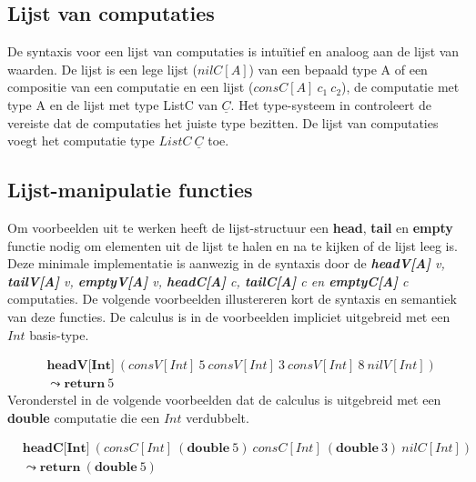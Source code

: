\subsection{Lijst van computaties}
De syntaxis voor een lijst van computaties is intuïtief en analoog aan de lijst van waarden. De lijst is een lege lijst ($nilC[A]$) van een bepaald type A of een compositie van een computatie en een lijst ($consC[A] \  c_1 \ 
 c_2$), de computatie met type A en de lijst met type ListC van $\underline{C}$. Het type-systeem in  controleert de vereiste dat de computaties het juiste type bezitten. De lijst van computaties voegt het computatie type $ListC \ \underline{C}$ toe.

\subsection{Lijst-manipulatie functies}
Om voorbeelden uit te werken heeft de lijst-structuur een \textbf{head}, \textbf{tail} en \textbf{empty} functie nodig om elementen uit de lijst te halen en na te kijken of de lijst leeg is. Deze minimale implementatie is aanwezig in de syntaxis door de \emph{\textbf{headV[A]} v, \textbf{tailV[A]} v, \textbf{emptyV[A]} v, \textbf{headC[A]} c, \textbf{tailC[A]} c en \textbf{emptyC[A]} c} computaties. De volgende voorbeelden illustereren kort de syntaxis en semantiek van deze functies. De calculus is in de voorbeelden impliciet uitgebreid met een $Int$ basis-type.

\begin{equation}
    \begin{split}
        & \textbf{headV[Int]}\:(consV[Int] \  5 \  consV[Int] \  3 \  consV[Int] \  8 \  nilV[Int]) \\
        & \leadsto \textbf{return}\:5
    \end{split}
\end{equation}
Veronderstel in de volgende voorbeelden dat de calculus is uitgebreid met een \textbf{double} computatie die een $Int$ verdubbelt.

\begin{equation}
    \begin{split}
        & \textbf{headC[Int]}\:(consC[Int] \  (\textbf{double} \ 5) \   consC[Int] \ 
 (\textbf{double} \ 3) \  nilC[Int]) \\
        & \leadsto \textbf{return}\:(\textbf{double}\:5)
    \end{split}
\end{equation}

